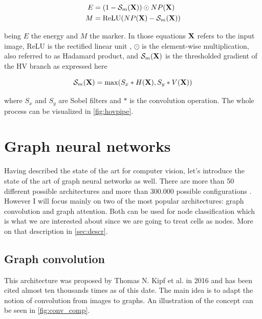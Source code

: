 \begin{align}
    E &= (1 - \mathcal{S}_m({\mathbf X})) \odot NP({\mathbf X}) \\
    M &= \text{ReLU}(NP({\mathbf X}) - \mathcal{S}_m({\mathbf X}))
\end{align}

\noindent being $E$ the energy and $M$ the marker. In those equations ${\mathbf X}$ refers to the input image, ReLU is the rectified linear unit \cite{relu}, $\odot$ is the element-wise multiplication, also referred to as Hadamard product, and $\mathcal{S}_m({\mathbf X})$ is the thresholded gradient of the HV branch as expressed here

\begin{equation}
    \mathcal{S}_m({\mathbf X}) = \max(S_x * H({\mathbf X}), S_y * V({\mathbf X}))
\end{equation}

\noindent where $S_x$ and $S_y$ are Sobel filters \cite{sobel} and $*$ is the convolution operation. The whole process can be visualized in \autoref{fig:hovpipe}. 


\section{Graph neural networks}\label{sec:gnn}

Having described the state of the art for computer vision, let's introduce the state of the art of graph neural networks as well. There are more than 50 different possible architectures \cite{graph_survey} and more than 300.000 possible configurations \cite{you2021design}. However I will focus mainly on two of the most popular architectures: graph convolution and graph attention. Both can be used for node classification which is what we are interested about since we are going to treat cells as nodes. More on that description in \autoref{sec:descr}.

\subsection{Graph convolution}\label{sec:gcn}

This architecture was proposed by Thomas N. Kipf et al. \cite{graphconv} in 2016 and has been cited almost ten thousands times as of this date. The main idea is to adapt the notion of convolution from images to graphs. An illustration of the concept can be seen in \autoref{fig:conv_comp}.

